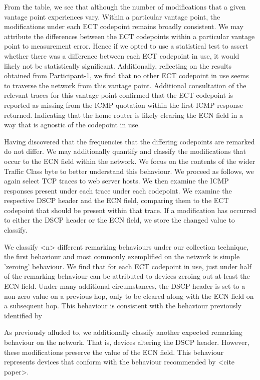 \documentclass{l4proj}
\begin{document}
From the table, we see that although the number of modifications that a given vantage point experiences vary. Within a particular vantage point, the modifications under each ECT codepoint remains broadly consistent. We may attribute the differences between the ECT codepoints within a particular vantage point to measurement error. Hence if we opted to use a statistical test to assert whether there was a difference between each ECT codepoint in use, it would likely not be statistically significant. Additionally, reflecting on the results obtained from Participant-1, we find that no other ECT codepoint in use seems to traverse the network from this vantage point. Additional consultation of the relevant traces for this vantage point confirmed that the ECT codepoint is reported as missing from the ICMP quotation within the first ICMP response returned. Indicating that the home router is likely clearing the ECN field in a way that is agnostic of the codepoint in use.


Having discovered that the frequencies that the differing codepoints are remarked do not differ. We may additionally quantify and classify the modifications that occur to the ECN field within the network. We focus on the contents of the wider Traffic Class byte to better understand this behaviour. We proceed as follows, we again select TCP traces to web server hosts. We then examine the ICMP responses present under each trace under each codepoint. We examine the respective DSCP header and the ECN field, comparing them to the ECT codepoint that should be present within that trace. If a modification has occurred to either the DSCP header or the ECN field, we store the changed value to classify.

We classify <n> different remarking behaviours under our collection technique, the first behaviour and most commonly exemplified on the network is simple 'zeroing' behaviour. We find that for each ECT codepoint in use, just under half of the remarking behaviour can be attributed to devices zeroing out at least the ECN field. Under many additional circumstances, the DSCP header is set to a non-zero value on a previous hop, only to be cleared along with the ECN field on a subsequent hop. This behaviour is consistent with the behaviour previously identified by \cite{custura_exploring_2018}

As previously alluded to, we additionally classify another expected remarking behaviour on the network. That is, devices altering the DSCP header. However, these modifications preserve the value of the ECN field. This behaviour represents devices that conform with the behaviour recommended by <cite paper>.
\end{document}
